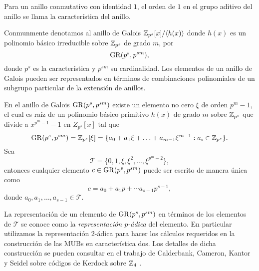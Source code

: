 \begin{definition}
  Para un anillo conmutativo con identidad $1$, el orden de
  $1$ en el grupo aditivo del anillo se llama la
  característica del anillo.
\end{definition}
Conmunmente denotamos al anillo de Galois $\operatorname{\mathbb{Z}}_{p^{s}}[x] /
\langle h(x) \rangle$ donde $h(x)$ es un polinomio básico
irreducible sobre $\operatorname{\mathbb{Z}}_{p^{s}}$ de grado $m$, por
\[
  \operatorname{GR}(p^{s}, p^{sm}),
\] 
donde $p^{s}$ es la característica y $p^{sm}$ su
cardinalidad. Los elementos de un anillo de Galois pueden
ser representados en términos de combinaciones polinomiales
de un subgrupo particular de la extensión de anillos.
\begin{theorem}
  En el anillo de Galois $\operatorname{GR}(p^{s}, p^{sm})$ existe un
  elemento no cero $\xi$ de orden $p^{m}-1$, el cual es raíz
  de un polinomio básico primitivo $h(x)$ de grado $m$ sobre
  $\operatorname{\mathbb{Z}}_{p^{s}}$ que divide a $x^{p^{m}-1} - 1$ en
  $Z_{p^{s}}[x]$ tal que
  \begin{equation}
    \operatorname{GR}(p^{s},p^{sm})
    = \operatorname{\mathbb{Z}}_{p^{s}}[\xi]
    = \{a_0+a_1\xi+\ldots+a_{m-1}\xi^{m-1} : a_i \in
    \operatorname{\mathbb{Z}}_{p^{s}}\}.
  \end{equation}
  Sea
  \begin{equation}
    \mathcal T
    = \{0,1,\xi,\xi^2,\ldots,\xi^{p^{m}-2}\},
  \end{equation}
  entonces cualquier elemento $c \in \operatorname{GR}(p^{s},p^{sm})$ 
  puede ser escrito de manera única como
  \[
    c = a_0 + a_1p + \cdots a_{s-1}p^{s-1},
  \] 
  donde $a_0,a_1,\ldots,a_{s-1} \in \mathcal T$.
\end{theorem}
La representación de un elemento de $\operatorname{GR}(p^{s},p^{sm})$ en
términos de los elementos de $\mathcal T$ se conoce como la
\textit{representación $p$-ádica} del elemento. En
particular utilizamos la representación $2$-ádica para hacer
los cálculos requeridos en la construcción de las MUBs en
característica dos. Los detalles de dicha construcción se
pueden consultar en el trabajo de Calderbank, Cameron,
Kantor y Seidel sobre códigos de Kerdock sobre $\operatorname{\mathbb{Z}}_4$
\cite{calderbank1997}.

